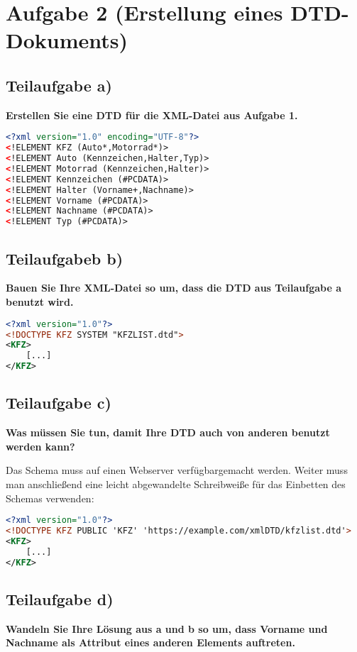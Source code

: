\section{Aufgabe 2 (Erstellung eines DTD-Dokuments)}


\subsection{Teilaufgabe a)}
\textbf{Erstellen Sie eine DTD für die XML-Datei aus Aufgabe 1.}

\begin{lstlisting}[language=xml, caption={XML-Datei},
label={lst:xml}]
<?xml version="1.0" encoding="UTF-8"?>
<!ELEMENT KFZ (Auto*,Motorrad*)>
<!ELEMENT Auto (Kennzeichen,Halter,Typ)>
<!ELEMENT Motorrad (Kennzeichen,Halter)>
<!ELEMENT Kennzeichen (#PCDATA)>
<!ELEMENT Halter (Vorname+,Nachname)>
<!ELEMENT Vorname (#PCDATA)>
<!ELEMENT Nachname (#PCDATA)>
<!ELEMENT Typ (#PCDATA)>
\end{lstlisting}

\subsection{Teilaufgabeb b)}
\textbf{Bauen Sie Ihre XML-Datei so um, dass die DTD aus Teilaufgabe a benutzt
wird.}
\begin{lstlisting}[language=xml, caption={XML-Datei},
label={lst:xml}]
<?xml version="1.0"?>
<!DOCTYPE KFZ SYSTEM "KFZLIST.dtd">
<KFZ>
	[...] 	
</KFZ>
\end{lstlisting}

\subsection{Teilaufgabe c)}
\textbf{Was müssen Sie tun, damit Ihre DTD auch von anderen benutzt werden
kann?}

Das Schema muss auf einen Webserver verfügbargemacht werden. Weiter muss man
anschließend eine leicht abgewandelte Schreibweiße für das Einbetten des Schemas
verwenden:
\begin{lstlisting}[language=xml, caption={XML-Datei},
label={lst:xml}]
<?xml version="1.0"?>
<!DOCTYPE KFZ PUBLIC 'KFZ' 'https://example.com/xmlDTD/kfzlist.dtd'>
<KFZ>
	[...]
</KFZ>
\end{lstlisting}

\subsection{Teilaufgabe d)}
\textbf{Wandeln Sie Ihre Lösung aus a und b so um, dass Vorname und Nachname als Attribut
eines anderen Elements auftreten.}

